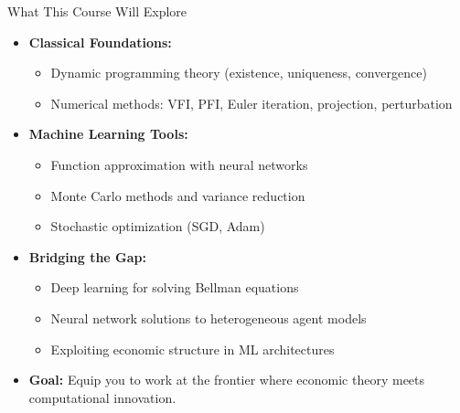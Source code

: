 \begin{frame}{What This Course Will Explore}
\begin{itemize}
\item \textbf{Classical Foundations:}
\begin{itemize}
    \item Dynamic programming theory (existence, uniqueness, convergence)
    \item Numerical methods: VFI, PFI, Euler iteration, projection, perturbation
\end{itemize}

\medskip
\item \textbf{Machine Learning Tools:}
\begin{itemize}
    \item Function approximation with neural networks
    \item Monte Carlo methods and variance reduction
    \item Stochastic optimization (SGD, Adam)
\end{itemize}

\medskip
\item \textbf{Bridging the Gap:}
\begin{itemize}
    \item Deep learning for solving Bellman equations
    \item Neural network solutions to heterogeneous agent models
    \item Exploiting economic structure in ML architectures
\end{itemize}

\medskip
\item \textbf{Goal:} Equip you to work at the frontier where economic theory meets computational innovation.
\end{itemize}
\end{frame}

